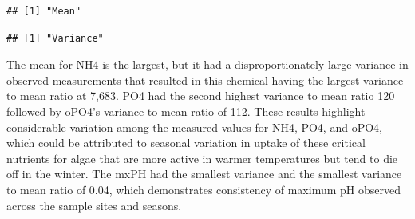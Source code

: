\documentclass[]{article}
\newenvironment{Shaded}{\begin{snugshade}}{\end{snugshade}}
\newcommand{\KeywordTok}[1]{\textcolor[rgb]{0.13,0.29,0.53}{\textbf{#1}}}
\newcommand{\DataTypeTok}[1]{\textcolor[rgb]{0.13,0.29,0.53}{#1}}
\newcommand{\StringTok}[1]{\textcolor[rgb]{0.31,0.60,0.02}{#1}}
\newcommand{\OtherTok}[1]{\textcolor[rgb]{0.56,0.35,0.01}{#1}}
\newcommand{\ControlFlowTok}[1]{\textcolor[rgb]{0.13,0.29,0.53}{\textbf{#1}}}
\newcommand{\OperatorTok}[1]{\textcolor[rgb]{0.81,0.36,0.00}{\textbf{#1}}}
\newcommand{\NormalTok}[1]{#1}
\begin{document}
\begin{verbatim}
## [1] "Mean"
\end{verbatim}

\begin{Shaded}
\end{Shaded}

\begin{verbatim}
## [1] "Variance"
\end{verbatim}

\begin{Shaded}
\end{Shaded}

The mean for NH4 is the largest, but it had a disproportionately large
variance in observed measurements that resulted in this chemical having
the largest variance to mean ratio at 7,683. PO4 had the second highest
variance to mean ratio 120 followed by oPO4's variance to mean ratio of
112. These results highlight considerable variation among the measured
values for NH4, PO4, and oPO4, which could be attributed to seasonal
variation in uptake of these critical nutrients for algae that are more
active in warmer temperatures but tend to die off in the winter. The
mxPH had the smallest variance and the smallest variance to mean ratio
of 0.04, which demonstrates consistency of maximum pH observed across
the sample sites and seasons.
\end{document}
